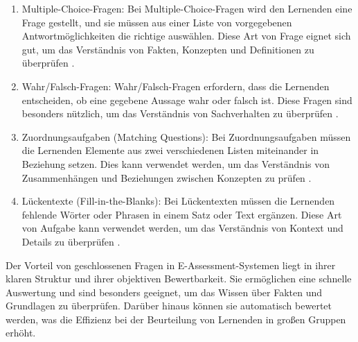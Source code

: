 \begin{enumerate}
    \item Multiple-Choice-Fragen: Bei Multiple-Choice-Fragen wird den Lernenden eine Frage gestellt, und sie müssen aus einer Liste von vorgegebenen Antwortmöglichkeiten die richtige auswählen. Diese Art von Frage eignet sich gut, um das Verständnis von Fakten, Konzepten und Definitionen zu überprüfen \cite{azevedo2019assessment}.

    \item Wahr/Falsch-Fragen: Wahr/Falsch-Fragen erfordern, dass die Lernenden entscheiden, ob eine gegebene Aussage wahr oder falsch ist. Diese Fragen sind besonders nützlich, um das Verständnis von Sachverhalten zu überprüfen \cite{khdour2020semantic}.

    \item Zuordnungsaufgaben (Matching Questions): Bei Zuordnungsaufgaben müssen die Lernenden Elemente aus zwei verschiedenen Listen miteinander in Beziehung setzen. Dies kann verwendet werden, um das Verständnis von Zusammenhängen und Beziehungen zwischen Konzepten zu prüfen \cite{gruttmann2009formatives}.

    \item Lückentexte (Fill-in-the-Blanks): Bei Lückentexten müssen die Lernenden fehlende Wörter oder Phrasen in einem Satz oder Text ergänzen. Diese Art von Aufgabe kann verwendet werden, um das Verständnis von Kontext und Details zu überprüfen \cite{gruttmann2009formatives}.
    
\end{enumerate}

Der Vorteil von geschlossenen Fragen in E-Assessment-Systemen liegt in ihrer klaren Struktur und ihrer objektiven Bewertbarkeit. Sie ermöglichen eine schnelle Auswertung und sind besonders geeignet, um das Wissen über Fakten und Grundlagen zu überprüfen. Darüber hinaus können sie automatisch bewertet werden, was die Effizienz bei der Beurteilung von Lernenden in großen Gruppen erhöht.

